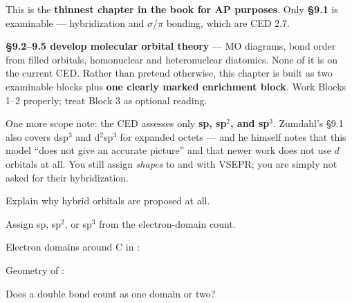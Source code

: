 \documentclass{apchem-notes}
\begin{document}
\apctitleblock

\begin{apcnote}
This is the \textbf{thinnest chapter in the book for AP purposes}. Only
\textbf{\S9.1} is examinable --- hybridization and $\sigma$/$\pi$ bonding,
which are CED 2.7.

\textbf{\S9.2--9.5 develop molecular orbital theory} --- MO diagrams, bond
order from filled orbitals, homonuclear and heteronuclear diatomics. None of
it is on the current CED. Rather than pretend otherwise, this chapter is
built as two examinable blocks plus \textbf{one clearly marked enrichment
block}. Work Blocks 1--2 properly; treat Block 3 as optional reading.

One more scope note: the CED assesses only \textbf{sp, sp$^2$, and sp$^3$}.
Zumdahl's \S9.1 also covers dsp$^3$ and d$^2$sp$^3$ for expanded octets ---
and he himself notes that this model ``does not give an accurate picture''
and that newer work does not use $d$ orbitals at all. You still assign
\emph{shapes} to  and  with VSEPR; you are simply not asked
for their hybridization.
\end{apcnote}


\begin{objectives}
  \item Explain why hybrid orbitals are proposed at all.
  \item Assign sp, sp$^2$, or sp$^3$ from the electron-domain count.
\end{objectives}


\begin{warmup}[3]
  \item Electron domains around C in : 
  \item Geometry of : 
  \item Does a double bond count as one domain or two?
\end{warmup}


\end{document}
